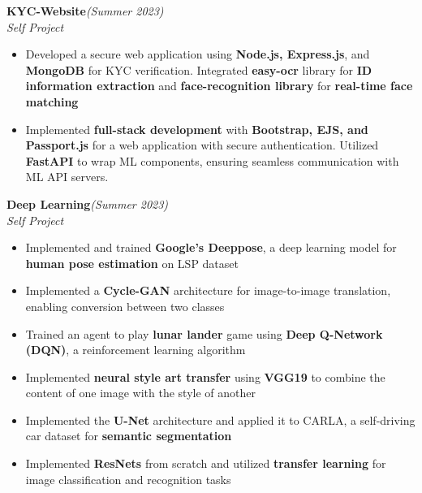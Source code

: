 \documentclass[a4paper,10pt]{article}
\begin{document}
\vspace{\baselineskip}
\vspace{-15pt}
\noindent\textbf{\large KYC-Website}\hfill{\sl \small (Summer 2023)}\\
{\it Self Project}
\\\vspace{-17pt}
\begin{itemize}[itemsep = -1.4 mm, leftmargin=*]
    \item Developed a secure web application using \textbf{Node.js, Express.js}, and \textbf{MongoDB} for KYC verification. Integrated \textbf{easy-ocr} library for \textbf{ID information extraction} and \textbf{face-recognition library} for \textbf{real-time face matching}
    \item Implemented \textbf{full-stack development} with \textbf{Bootstrap, EJS, and Passport.js} for a web application with secure authentication. Utilized \textbf{FastAPI} to wrap ML components, ensuring seamless communication with ML API servers.
\end{itemize}

\vspace{\baselineskip}
\vspace{-15pt}
\noindent\textbf{\large Deep Learning}\hfill{\sl \small (Summer 2023)}\\
{\it Self Project}
\\\vspace{-17pt}
\begin{itemize}[itemsep = -1.4 mm, leftmargin=*]
    \item Implemented and trained \textbf{Google's Deeppose}, a deep learning model for \textbf{human pose estimation} on LSP dataset
    \item Implemented a \textbf{Cycle-GAN} architecture for image-to-image translation, enabling conversion between two classes 
    \item Trained an agent to play \textbf{lunar lander} game using \textbf{Deep Q-Network (DQN)}, a reinforcement learning algorithm
    \item Implemented \textbf{neural style art transfer} using \textbf{VGG19} to combine the content of one image with the style of another
    \item Implemented the \textbf{U-Net} architecture and applied it to CARLA, a self-driving car dataset for \textbf{semantic segmentation}
    \item Implemented \textbf{ResNets} from scratch and utilized \textbf{transfer learning} for image classification and recognition tasks
\end{itemize}
\end{document}
